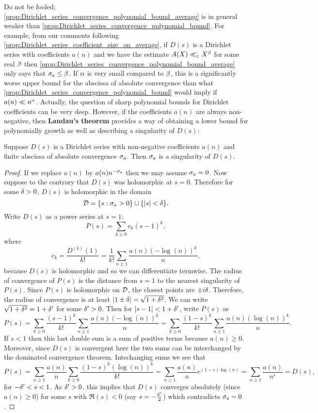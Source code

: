       Do not be fooled; \cref{prop:Dirichlet_series_convergence_polynomial_bound_average} is in general weaker than \cref{prop:Dirichlet_series_convergence_polynomial_bound}. For example, from our comments following \cref{prop:Dirichlet_series_coefficient_size_on_average}, if $D(s)$ is a Dirichlet series with coefficients $a(n)$ and we have the estimate $A(X) \ll_{\varepsilon} X^{\beta}$ for some real $\beta$ then \cref{prop:Dirichlet_series_convergence_polynomial_bound_average} only says that $\sigma_{a} \le \beta$. If $\alpha$ is very small compared to $\beta$, this is a significantly worse upper bound for the abscissa of absolute convergence than what \cref{prop:Dirichlet_series_convergence_polynomial_bound} would imply if $a(n) \ll n^{\alpha}$. Actually, the question of sharp polynomial bounds for Dirichlet coefficients can be very deep. However, if the coefficients $a(n)$ are always non-negative, then \textbf{Landau's theorem} provides a way of obtaining a lower bound for polynomially growth as well as describing a singularity of $D(s)$:

      \begin{theorem}
        Suppose $D(s)$ is a Dirichlet series with non-negative coefficients $a(n)$ and finite abscissa of absolute convergence $\sigma_{a}$. Then $\sigma_{a}$ is a singularity of $D(s)$.
      \end{theorem}
      \begin{proof}
        If we replace $a(n)$ by $a(n)n^{-\sigma_{a}}$ then we may assume $\sigma_{a} = 0$. Now suppose to the contrary that $D(s)$ was holomorphic at $s = 0$. Therefore for some $\delta > 0$, $D(s)$ is holomorphic in the domain
        \[
          \mathcal{D} = \{s:\sigma_{a} > 0\} \cup \{|s| < \delta\}.
        \]
        Write $D(s)$ as a power series at $s = 1$:
        \[
          P(s) = \sum_{k \ge 0}c_{k}(s-1)^{k},
        \]
        where
        \[
          c_{k} = \frac{D^{(k)}(1)}{k!} = \frac{1}{k!}\sum_{n \ge 1}\frac{a(n)(-\log(n))^{k}}{n},
        \]
        because $D(s)$ is holomorphic and so we can differentiate termwise. The radius of convergence of $P(s)$ is the distance from $s = 1$ to the nearest singularity of $P(s)$. Since $P(s)$ is holomorphic on $\mathcal{D}$, the closest points are $\pm i\delta$. Therefore, the radius of convergence is at least $|1\pm\delta| = \sqrt{1+\delta^{2}}$. We can write $\sqrt{1+\delta^{2}} = 1+\delta'$ for some $\delta' > 0$. Then for $|s-1| < 1+\delta'$, write $P(s)$ as
        \[
          P(s) = \sum_{k \ge 0}\frac{(s-1)^{k}}{k!}\sum_{n \ge 1}\frac{a(n)(-\log(n))^{k}}{n} = \sum_{k \ge 0}\frac{(1-s)^{k}}{k!}\sum_{n \ge 1}\frac{a(n)(\log(n))^{k}}{n}.
        \]
        If $s < 1$ then this last double sum is a sum of positive terms because $a(n) \ge 0$. Moreover, since $D(s)$ is convergent here the two sums can be interchanged by the dominated convergence theorem. Intechanging sums we see that
        \[
          P(s) = \sum_{n \ge 1}\frac{a(n)}{n}\sum_{k \ge 0}\frac{(1-s)^{k}(\log(n))^{k}}{k!} = \sum_{n \ge 1}\frac{a(n)}{n}e^{(1-s)\log(n)} = \sum_{n \ge 1}\frac{a(n)}{n^{s}} = D(s),
        \]
        for $-\delta' < s < 1$. As $\delta' > 0$, this implies that $D(s)$ converges absolutely (since $a(n) \ge 0$) for some $s$ with $\Re(s) < 0$ (say $s = -\frac{\delta'}{2}$) which contradicts $\sigma_{a} = 0$.
      \end{proof}


